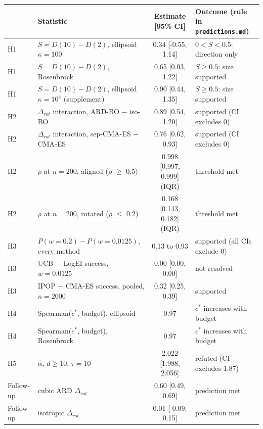 \begin{tabular}{llcl}
\toprule
 & Statistic & Estimate [95\% CI] & Outcome (rule in \texttt{predictions.md}) \\
\midrule
H1 & $S=D(10)-D(2)$, ellipsoid $\kappa=100$ & 0.34 [-0.55, 1.14] & $0<S<0.5$: direction only \\
H1 & $S=D(10)-D(2)$, Rosenbrock & 0.65 [0.03, 1.22] & $S\geq0.5$: size supported \\
H1 & $S=D(10)-D(2)$, ellipsoid $\kappa=10^4$ (supplement) & 0.90 [0.44, 1.35] & $S\geq0.5$: size supported \\
H2 & $\Delta_{rot}$ interaction, ARD-BO $-$ iso-BO & 0.89 [0.54, 1.20] & supported (CI excludes 0) \\
H2 & $\Delta_{rot}$ interaction, sep-CMA-ES $-$ CMA-ES & 0.76 [0.62, 0.93] & supported (CI excludes 0) \\
H2 & $\rho$ at $n=200$, aligned ($\rho$ $\geq$ 0.5) & 0.998 [0.997, 0.999] (IQR) & threshold met \\
H2 & $\rho$ at $n=200$, rotated ($\rho$ $\leq$ 0.2) & 0.168 [0.143, 0.182] (IQR) & threshold met \\
H3 & $P(w{=}0.2)-P(w{=}0.0125)$, every method & 0.13 to 0.93 & supported (all CIs exclude 0) \\
H3 & UCB $-$ LogEI success, $w=0.0125$ & 0.00 [0.00, 0.00] & not resolved \\
H3 & IPOP $-$ CMA-ES success, pooled, $n=2000$ & 0.32 [0.25, 0.39] & supported \\
H4 & Spearman($c^*$, budget), ellipsoid & 0.97 & $c^*$ increases with budget \\
H4 & Spearman($c^*$, budget), Rosenbrock & 0.97 & $c^*$ increases with budget \\
H5 & $\hat\alpha$, $d\geq10$, $\tau=10$ & 2.022 [1.988, 2.056] & refuted (CI excludes 1.87) \\
Follow-up & cubic ARD $\Delta_{rot}$ & 0.60 [0.49, 0.69] & prediction met \\
Follow-up & isotropic $\Delta_{rot}$ & 0.01 [-0.09, 0.15] & prediction met \\
\bottomrule
\end{tabular}
